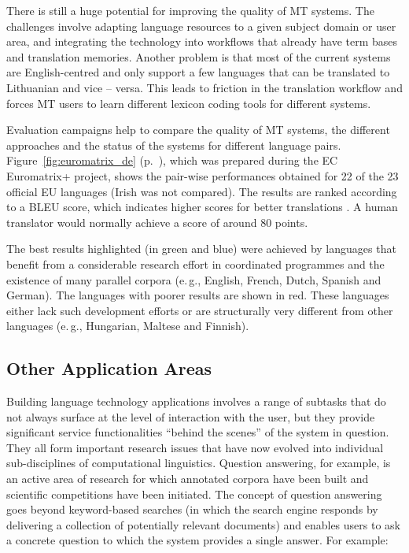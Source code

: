 \begin{multicols}{2}
There is still a huge potential for improving the quality of MT systems. The challenges involve adapting language resources to a given subject domain or user area, and integrating the technology into workflows that already have term bases and translation memories. Another problem is that most of the current systems are English-centred and only support a few languages that can be translated to Lithuanian and vice -- versa. This leads to friction in the translation workflow and forces MT users to learn different lexicon coding tools for different systems.

Evaluation campaigns help to compare the quality of MT systems, the different approaches and the status of the systems for different language pairs. Figure~\ref{fig:euromatrix_de} (p.~\pageref{fig:euromatrix_de}), which was prepared during the EC Euromatrix+ project, shows the pair-wise performances obtained for 22 of the 23 official EU languages (Irish was not compared). The results are ranked according to a BLEU score, which indicates higher scores for better translations \cite{bleu1}. A human translator would normally achieve a score of around 80 points.

The best results highlighted (in green and blue) were achieved by languages that benefit from a considerable research effort in coordinated programmes and the existence of many parallel corpora (e.\,g., English, French, Dutch, Spanish and German). The languages with poorer results are shown in red. These languages either lack such development efforts or are structurally very different from other languages (e.\,g., Hungarian, Maltese and Finnish).


\subsection{Other Application Areas}

Building language technology applications involves a range of subtasks that do not always surface at the level of interaction with the user, but they provide significant service functionalities “behind the scenes” of the system in question. They all form important research issues that have now evolved into individual sub-disciplines of computational linguistics.  Question answering, for example, is an active area of research for which annotated corpora have been built and scientific competitions have been initiated. The concept of question answering goes beyond keyword-based searches (in which the search engine responds by delivering a collection of potentially relevant documents) and enables users to ask a concrete question to which the system provides a single answer. For example:


\end{multicols}
